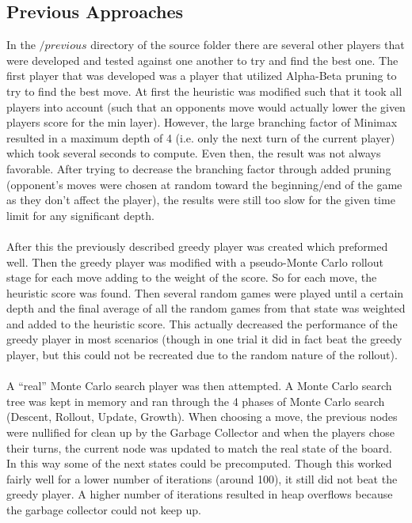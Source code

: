 \documentclass[paper=a4, fontsize=11pt]{scrartcl}
\numberwithin{equation}{section}		%
\numberwithin{figure}{section}			%
\numberwithin{table}{section}				%
\begin{document}
\subsection{Previous Approaches}
In the $/previous$ directory of the source folder there are several other players that were developed and tested against one another to try and find the best one. The first player that was developed was a player that utilized Alpha-Beta pruning to try to find the best move. At first the heuristic was modified such that it took all players into account (such that an opponents move would actually lower the given players score for the min layer). However, the large branching factor of Minimax resulted in a maximum depth of 4 (i.e. only the next turn of the current player) which took several seconds to compute. Even then, the result was not always favorable. After trying to decrease the branching factor through added pruning (opponent's moves were chosen at random toward the beginning/end of the game as they don't affect the player), the results were still too slow for the given time limit for any significant depth. \\\\After this the previously described greedy player was created which preformed well. Then the greedy player was modified with a pseudo-Monte Carlo rollout stage for each move adding to the weight of the score. So for each move, the heuristic score was found. Then several random games were played until a certain depth and the final average of all the random games from that state was weighted and added to the heuristic score. This actually decreased the performance of the greedy player in most scenarios (though in one trial it did in fact beat the greedy player, but this could not be recreated due to the random nature of the rollout). \\\\A ``real'' Monte Carlo search player was then attempted. A Monte Carlo search tree was kept in memory and ran through the 4 phases of Monte Carlo search (Descent, Rollout, Update, Growth). When choosing a move, the previous nodes were nullified for clean up by the Garbage Collector and when the players chose their turns, the current node was updated to match the real state of the board. In this way some of the next states could be precomputed. Though this worked fairly well for a lower number of iterations (around 100), it still did not beat the greedy player. A higher number of iterations resulted in heap overflows because the garbage collector could not keep up. 
\end{document}
